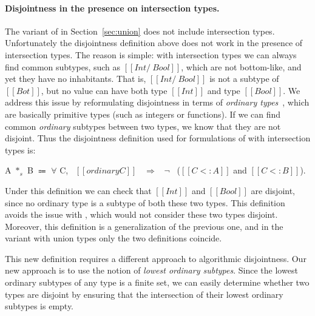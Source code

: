 \paragraph{Disjointness in the presence on intersection types.}
The variant of \cal in Section~\ref{sec:union} does not include intersection types.
Unfortunately the disjointness definition above does not work in the presence of
intersection types. The reason is simple: with intersection types we can always find
common subtypes, such as $[[Int /\ Bool]]$, which are not bottom-like, and yet
they have no inhabitants. That is,
$[[Int /\ Bool]]$ is not a subtype of $[[Bot]]$, but no value can have both type
$[[Int]]$ and type $[[Bool]]$.
We address this issue by reformulating
disjointness in terms of \textit{ordinary types}~\cite{davies2000intersection}, which are basically primitive types
(such as integers or functions).
If we can find common \emph{ordinary} subtypes between two types, we know that they
are not disjoint.
Thus the disjointness definition used for formulations
of \name with intersection types is:

\begin{definition}
\label{def:over:disj}
  A $*_s$ B $\Coloneqq$ $\forall$ C, \ $[[ordinary C]]$ \ $\Longrightarrow$ \ $\neg$ \ ($[[C <: A]]$ and $[[C <: B]]$).
\end{definition}

\begin{comment}
\snow{Following is an alternative definition. Would it looks simpler?}

\begin{definition}
\label{def:inter:disj}
  A $*_s$ B $\Coloneqq$ $\forall$ C, \ $\neg$ ($[[ordinary C]]$ and $[[C <: A]]$ and $[[C <: B]]$).
\end{definition}
\end{comment}

\noindent Under this definition we can check that $[[Int]]$ and $[[Bool]]$ are disjoint,
since no ordinary type is a subtype of both these two types. This definition avoids
the issue with , which would not consider these two types disjoint.
Moreover, this definition is a generalization of the previous one, and in the
variant with union types only the two definitions coincide.

This new definition requires a different approach to algorithmic disjointness. Our new
approach is to use the notion of \emph{lowest ordinary subtypes}. Since the lowest ordinary
subtypes of any type is a finite set, we can easily determine whether two types are disjoint
by ensuring that the intersection of their lowest ordinary subtypes is empty.

